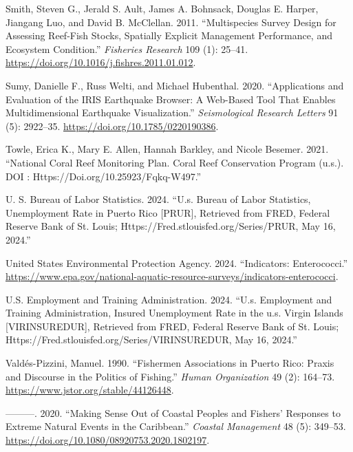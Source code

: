 \documentclass[
  letterpaper,
  oneside,
  open=any]{scrbook}
\newlength{\cslhangindent}
\newenvironment{CSLReferences}[2] %
 {\begin{list}{}{%
  \setlength{\itemindent}{0pt}
  \setlength{\leftmargin}{0pt}
  \setlength{\parsep}{0pt}
  \ifodd #1
   \setlength{\leftmargin}{\cslhangindent}
   \setlength{\itemindent}{-1\cslhangindent}
  \fi
  \setlength{\itemsep}{#2\baselineskip}}}
 {\end{list}}
\begin{document}
\begin{CSLReferences}{1}{0}
Smith, Steven G., Jerald S. Ault, James A. Bohnsack, Douglas E. Harper,
Jiangang Luo, and David B. McClellan. 2011. {``Multispecies Survey
Design for Assessing Reef-Fish Stocks, Spatially Explicit Management
Performance, and Ecosystem Condition.''} \emph{Fisheries Research} 109
(1): 25--41. \url{https://doi.org/10.1016/j.fishres.2011.01.012}.

Sumy, Danielle F., Russ Welti, and Michael Hubenthal. 2020.
{``Applications and Evaluation of the IRIS Earthquake Browser: A
Web{-}Based Tool That Enables Multidimensional Earthquake
Visualization.''} \emph{Seismological Research Letters} 91 (5):
2922--35. \url{https://doi.org/10.1785/0220190386}.

Towle, Erica K., Mary E. Allen, Hannah Barkley, and Nicole Besemer.
2021. {``National Coral Reef Monitoring Plan. Coral Reef Conservation
Program (u.s.). DOI : Https://Doi.org/10.25923/Fqkq-W497.''}

U. S. Bureau of Labor Statistics. 2024. {``U.s. Bureau of Labor
Statistics, Unemployment Rate in Puerto Rico {[}PRUR{]}, Retrieved from
FRED, Federal Reserve Bank of St. Louis;
Https://Fred.stlouisfed.org/Series/PRUR, May 16, 2024.''}

United States Environmental Protection Agency. 2024. {``Indicators:
Enterococci.''}
\url{https://www.epa.gov/national-aquatic-resource-surveys/indicators-enterococci}.

U.S. Employment and Training Administration. 2024. {``U.s. Employment
and Training Administration, Insured Unemployment Rate in the u.s.
Virgin Islands {[}VIRINSUREDUR{]}, Retrieved from FRED, Federal Reserve
Bank of St. Louis; Https://Fred.stlouisfed.org/Series/VIRINSUREDUR, May
16, 2024.''}

Valdés-Pizzini, Manuel. 1990. {``Fishermen Associations in Puerto Rico:
Praxis and Discourse in the Politics of Fishing.''} \emph{Human
Organization} 49 (2): 164--73.
\url{https://www.jstor.org/stable/44126448}.

---------. 2020. {``Making Sense Out of Coastal Peoples and Fishers'
Responses to Extreme Natural Events in the Caribbean.''} \emph{Coastal
Management} 48 (5): 349--53.
\url{https://doi.org/10.1080/08920753.2020.1802197}.


\end{CSLReferences}
\end{document}
